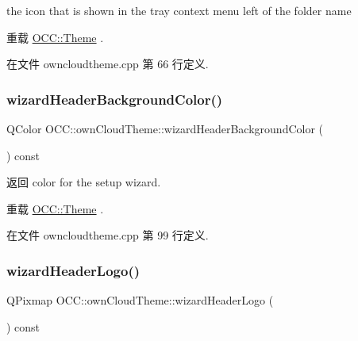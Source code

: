 the icon that is shown in the tray context menu left of the folder name 

重载 \hyperlink{class_o_c_c_1_1_theme_ab4b9822667ab5ba98fd2ce9786282ab7}{O\+C\+C\+::\+Theme} .



在文件 owncloudtheme.\+cpp 第 66 行定义.

\mbox{\label{class_o_c_c_1_1own_cloud_theme_a704928959879d3343f1d68c665bd11fb}} 
\subsubsection{\texorpdfstring{wizard\+Header\+Background\+Color()}{wizardHeaderBackgroundColor()}}
{\footnotesize\ttfamily Q\+Color O\+C\+C\+::own\+Cloud\+Theme\+::wizard\+Header\+Background\+Color (\begin{DoxyParamCaption}{ }\end{DoxyParamCaption}) const\hspace{0.3cm}{\ttfamily [virtual]}}

\begin{DoxyReturn}{返回}
color for the setup wizard. 
\end{DoxyReturn}


重载 \hyperlink{class_o_c_c_1_1_theme_a65e6b8932baedf7b63b61d0fd5bc5420}{O\+C\+C\+::\+Theme} .



在文件 owncloudtheme.\+cpp 第 99 行定义.

\mbox{\label{class_o_c_c_1_1own_cloud_theme_ac9b6d61d21d239bfa4bf156482e63f76}} 
\subsubsection{\texorpdfstring{wizard\+Header\+Logo()}{wizardHeaderLogo()}}
{\footnotesize\ttfamily Q\+Pixmap O\+C\+C\+::own\+Cloud\+Theme\+::wizard\+Header\+Logo (\begin{DoxyParamCaption}{ }\end{DoxyParamCaption}) const\hspace{0.3cm}{\ttfamily [virtual]}}

